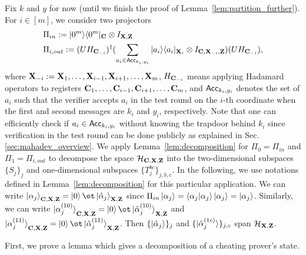 Fix $k$ and $y$ for now (until we finish the proof of Lemma~\ref{lem:partition_further}). For $i\in [m]$, we consider two projectors 
\begin{align*}
    &\Pi_{in}:= |0^m\rangle\langle0^m|_{\mathbf{C}}\otimes I_{\mathbf{X},\mathbf{Z}}\\
   & \Pi_{i,out} := (UH_{\mathbf{C}_{-i}})^{\dag}(\sum_{a_i\in \mathsf{Acc}_{k_i,y_i}}|a_i\rangle\langle a_i|_{\mathbf{X}_i}\otimes I_{\mathbf{C},\mathbf{X}_{-i},\mathbf{Z}}) (UH_{\mathbf{C}_{-i}}),
\end{align*}
where 
$\mathbf{X}_{-i}:= \mathbf{X}_1,\dots,\mathbf{X}_{i-1}, \mathbf{X}_{i+1},\dots, \mathbf{X}_{m}$,  $H_{\mathbf{C}_{-i}}$ means applying Hadamard operators to registers $\mathbf{C}_1,\dots,\mathbf{C}_{i-1}, \mathbf{C}_{i+1},\dots, \mathbf{C}_{m}$, and $\mathsf{Acc}_{k_i,y_i}$ denotes the set of $a_i$ such that the verifier accepts $a_i$ in the test round on the $i$-th coordinate when the first and second messages are $k_i$ and $y_i$, respectively.
Note that one can efficiently check if $a_i\in \mathsf{Acc}_{k_i,y_i}$ without knowing the trapdoor behind $k_i$ since verification in the test round can be done publicly as explained in Sec. \ref{sec:mahadev_overview}. 
We apply Lemma~\ref{lem:decomposition} for $\Pi_0= \Pi_{in}$ and $\Pi_1=\Pi_{i,out}$ to decompose the space  $\mathcal{H}_{\mathbf{C},\mathbf{X},\mathbf{Z}}$ into the two-dimensional subspaces $\{S_j\}_{j}$ and one-dimensional subspaces $\{T_{j}^{bc}\}_{j,b,c}$.
In the following, we use notations defined in Lemma~\ref{lem:decomposition} for this particular application.
We can write $\ket{\alpha_j}_{\regC,\regX,\regZ}=\ket{0}\ot \ket{\hat{\alpha}_j}_{\regX,\regZ}$  since $\Pi_{in}\ket{\alpha_j}=\langle \alpha_j|\alpha_j\rangle\ket{\alpha_j}=\ket{\alpha_j}$.
Similarly, we can write  $\ket{\alpha_j^{(10)}}_{\regC,\regX,\regZ}=\ket{0}\ot \ket{\hat{\alpha}_j^{(10)}}_{\regX,\regZ}$ 
and  $\ket{\alpha_j^{(11)}}_{\regC,\regX,\regZ}=\ket{0}\ot \ket{\hat{\alpha}_j^{(11)}}_{\regX,\regZ}$. 
Then  $\{\ket{\hat{\alpha}_j}\}_{j}$ and $\{\ket{\hat{\alpha}_{j}^{(1c)}}\}_{j,c}$ span $\mathcal{H}_{\mathbf{X},\mathbf{Z}}$. 

First, we prove a lemma which gives a decomposition of a cheating prover's state.

